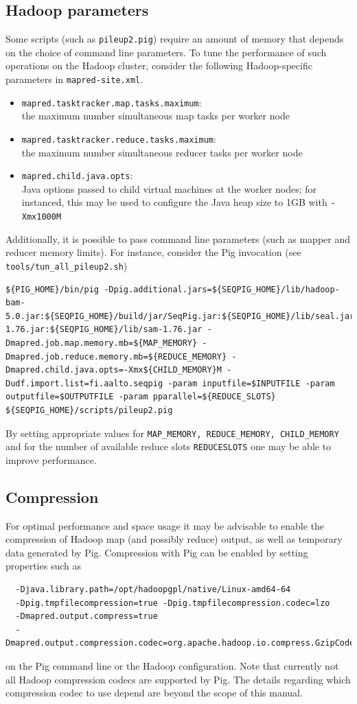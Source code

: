 \subsection{Hadoop parameters}

Some scripts (such as {\tt pileup2.pig}) require an amount of memory that
depends on the choice of command line parameters. To tune the performance of
such operations on the Hadoop cluster,
consider the following Hadoop-specific parameters in {\tt mapred-site.xml}.
\begin{itemize}
\item {\tt mapred.tasktracker.map.tasks.maximum}: \\the maximum number simultaneous map tasks per worker node
\item {\tt mapred.tasktracker.reduce.tasks.maximum}:\\ the maximum number simultaneous reducer tasks per worker node
\item {\tt mapred.child.java.opts}:\\ Java options passed to child virtual
	machines at the worker nodes; for instanced, this may be used to configure
	the Java heap size to 1GB with {\tt -Xmx1000M}
\end{itemize}
Additionally, it is possible to pass command line parameters (such as mapper and reducer memory limits).
For instance, consider the Pig invocation (see {\tt tools/tun\_all\_pileup2.sh})
\begin{lstlisting}
${PIG_HOME}/bin/pig -Dpig.additional.jars=${SEQPIG_HOME}/lib/hadoop-bam-5.0.jar:${SEQPIG_HOME}/build/jar/SeqPig.jar:${SEQPIG_HOME}/lib/seal.jar:${SEQPIG_HOME}/lib/picard-1.76.jar:${SEQPIG_HOME}/lib/sam-1.76.jar -Dmapred.job.map.memory.mb=${MAP_MEMORY} -Dmapred.job.reduce.memory.mb=${REDUCE_MEMORY} -Dmapred.child.java.opts=-Xmx${CHILD_MEMORY}M -Dudf.import.list=fi.aalto.seqpig -param inputfile=$INPUTFILE -param outputfile=$OUTPUTFILE -param pparallel=${REDUCE_SLOTS} ${SEQPIG_HOME}/scripts/pileup2.pig
\end{lstlisting}
By setting appropriate values for {\tt MAP\_MEMORY, REDUCE\_MEMORY,
CHILD\_MEMORY} and for the number of available reduce slots {\tt REDUCESLOTS}
one may be able to improve performance.

\subsection{Compression}

For optimal performance and space usage it may be advisable to enable the compression of
Hadoop map (and possibly reduce) output, as well as temporary data generated
by Pig. Compression with Pig can be enabled by setting properties such as
\begin{lstlisting}
  -Djava.library.path=/opt/hadoopgpl/native/Linux-amd64-64
  -Dpig.tmpfilecompression=true -Dpig.tmpfilecompression.codec=lzo
  -Dmapred.output.compress=true
  -Dmapred.output.compression.codec=org.apache.hadoop.io.compress.GzipCodec
\end{lstlisting}
on the Pig command line or the Hadoop configuration. Note that currently not all
Hadoop compression codecs are supported by Pig.  The details regarding which
compression codec to use depend are beyond the scope of this manual.
